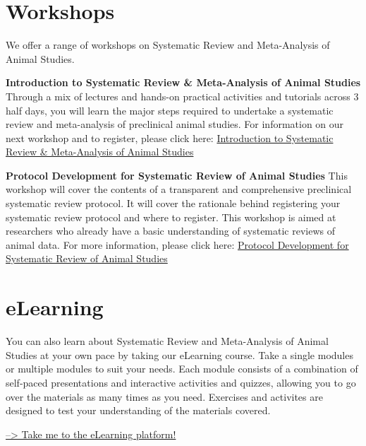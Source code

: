 \documentclass[
]{book}
\begin{document}
\hypertarget{workshops-1}{%
\section{Workshops}\label{workshops-1}}

We offer a range of workshops on Systematic Review and Meta-Analysis of Animal Studies.

\textbf{Introduction to Systematic Review \& Meta-Analysis of Animal Studies}
Through a mix of lectures and hands-on practical activities and tutorials across 3 half days, you will learn the major steps required to undertake a systematic review and meta-analysis of preclinical animal studies. For information on our next workshop and to register, please click here: \href{https://www.bihealth.org/en/translation/innovation-enabler/quest-center/mission-approaches/education-and-training/how-to-conduct-a-preclinical-animal-systematic-review-and-meta-analysi}{Introduction to Systematic Review \& Meta-Analysis of Animal Studies}

\textbf{Protocol Development for Systematic Review of Animal Studies}
This workshop will cover the contents of a transparent and comprehensive preclinical systematic review protocol. It will cover the rationale behind registering your systematic review protocol and where to register. This workshop is aimed at researchers who already have a basic understanding of systematic reviews of animal data. For more information, please click here: \href{https://www.bihealth.org/en/translation/innovation-enabler/quest-center/mission-approaches/education-and-training/protocol-development-for-systematic-review-of-animal-studies}{Protocol Development for Systematic Review of Animal Studies}

\hypertarget{elearning}{%
\section{eLearning}\label{elearning}}

You can also learn about Systematic Review and Meta-Analysis of Animal Studies at your own pace by taking our eLearning course. Take a single modules or multiple modules to suit your needs. Each module consists of a combination of self-paced presentations and interactive activities and quizzes, allowing you to go over the materials as many times as you need. Exercises and activites are designed to test your understanding of the materials covered.

\href{https://courses.bihealth.org}{--\textgreater{} Take me to the eLearning platform!}
\end{document}
